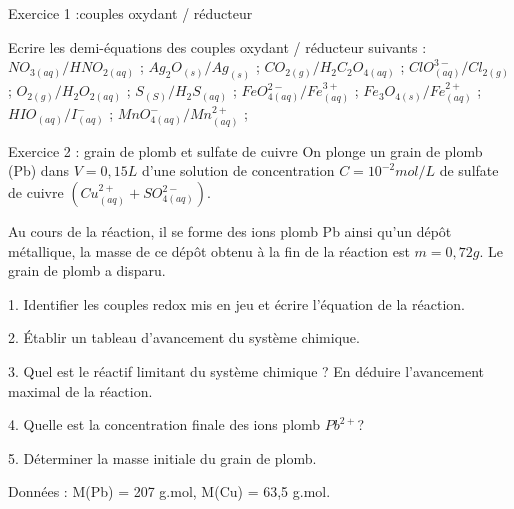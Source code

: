 \documentclass[12pt, french]{article}
\begin{document}
\begin{center}

\end{center}


   \begin{Box2}{Exercice 1 :couples oxydant / réducteur } 

Ecrire les demi-équations des couples oxydant / réducteur suivants : 
$NO_{3 (aq)}/HNO_{2 (aq)}$ ;  $Ag_2O_{(s)}/Ag_{(s)}$ ; 
      $CO_{2 (g)}/H_2C_2O_{4 (aq)}$ ; 
$ClO_{(aq)}^{3-}/Cl_{2 (g)}$ ; 
      $O_{2(g)}/H_2O_{2 (aq)}$ ; 
      $S_{(S)}/H_2S_{(aq)}$ ;
      $FeO_{4 (aq)}^{2-}/Fe_{(aq)}^{3+}$ ;
      $Fe_3O_{4 (s)}/ Fe_{(aq)}^{2+}$ ; 
$HIO_{(aq)}/I_{(aq)}^-$ ; 
      $MnO_{4 (aq)}^-/ Mn_{(aq)}^{2+}$  ; 


   \end{Box2}

\begin{Box2}{Exercice 2 : grain de plomb et sulfate de cuivre
 }
   On plonge un grain de plomb (Pb) dans $V = 0,15L$ d'une solution de concentration $C = 10^{-2} mol/L$ de sulfate de cuivre
$( Cu^{2+}_{(aq)} + SO^{2-}_{4 (aq)} )$.

Au cours de la réaction, il se forme des ions plomb Pb ainsi qu'un dépôt métallique, la masse de ce dépôt obtenu à la fin de la
réaction est $m = 0,72 g$. Le grain de plomb a disparu.

   1. Identifier les couples redox mis en jeu et écrire l'équation de la réaction.

   2. Établir un tableau d'avancement du système chimique.

   3. Quel est le réactif limitant du système chimique ? En déduire l'avancement maximal de la réaction.

   4. Quelle est la concentration finale des ions plomb $Pb^{2+}$?

5. Déterminer la masse initiale du grain de plomb.

Données : M(Pb) = 207 g.mol, M(Cu) = 63,5 g.mol.

\end{Box2}
\end{document}
